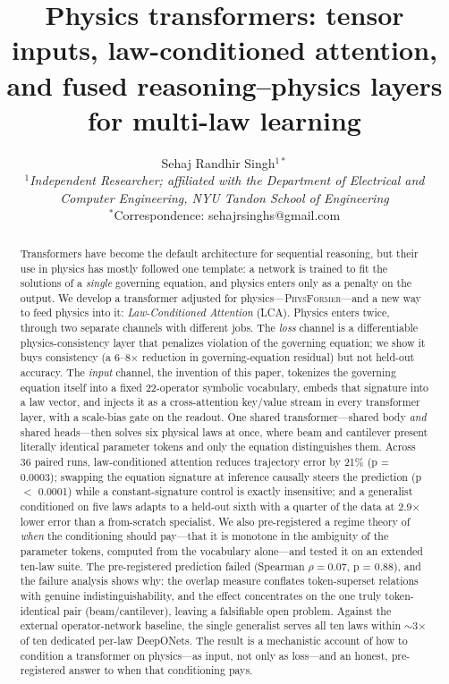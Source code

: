 \documentclass[11pt,a4paper]{article}
\title{\Large\bfseries Physics transformers: tensor inputs, law-conditioned
attention, and fused reasoning--physics layers for multi-law learning}
\author{
  Sehaj Randhir Singh$^{1*}$ \\
  \small\textit{$^{1}$Independent Researcher; affiliated with the Department of
  Electrical and Computer Engineering, NYU Tandon School of Engineering}\\
  \small$^{*}$Correspondence: sehajrsinghs@gmail.com
}
\date{}
\newcommand{\PT}{{\scshape PhysFormer}}
\newcommand{\LCA}{{\scshape LCA}}
\begin{document}
\maketitle
\vspace{-1.2em}

\begin{abstract}
\noindent Transformers have become the default architecture for sequential
reasoning, but their use in physics has mostly followed one template: a
network is trained to fit the solutions of a \emph{single} governing equation,
and physics enters only as a penalty on the output. We develop a transformer
adjusted for physics---\PT---and a new way to feed physics into it:
\emph{Law-Conditioned Attention} (\LCA). Physics enters twice, through two
separate channels with different jobs. The \emph{loss} channel is a
differentiable physics-consistency layer that penalizes violation of the
governing equation; we show it buys consistency (a 6--8$\times$ reduction in
governing-equation residual) but not held-out accuracy. The \emph{input}
channel, the invention of this paper, tokenizes the governing equation itself
into a fixed 22-operator symbolic vocabulary, embeds that signature into a law
vector, and injects it as a cross-attention key/value stream in every
transformer layer, with a scale-bias gate on the readout. One shared
transformer---shared body \emph{and} shared heads---then solves six physical
laws at once, where beam and cantilever present literally identical parameter
tokens and only the equation distinguishes them. Across 36 paired runs,
law-conditioned attention reduces trajectory error by 21\% (p = 0.0003);
swapping the equation signature at inference causally steers the prediction
(p $<$ 0.0001) while a constant-signature control is exactly insensitive; and
a generalist conditioned on five laws adapts to a held-out sixth with a
quarter of the data at 2.9$\times$ lower error than a from-scratch
specialist. We also pre-registered a regime theory of \emph{when} the
conditioning should pay---that it is monotone in the ambiguity of the
parameter tokens, computed from the vocabulary alone---and tested it on an
extended ten-law suite. The pre-registered prediction failed (Spearman
$\rho = 0.07$, p = 0.88), and the failure analysis shows why: the overlap
measure conflates token-superset relations with genuine indistinguishability,
and the effect concentrates on the one truly token-identical pair
(beam/cantilever), leaving a falsifiable open problem. Against the external
operator-network baseline, the single generalist serves all ten laws within
$\sim$3$\times$ of ten dedicated per-law DeepONets. The result is a mechanistic
account of how to condition a transformer on physics---as input, not only as
loss---and an honest, pre-registered answer to when that conditioning pays.
\end{abstract}
\end{document}
